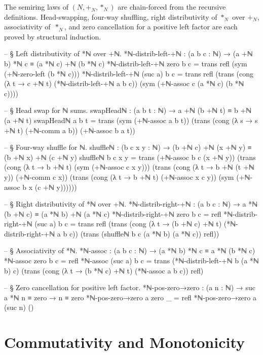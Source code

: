 \documentclass[11pt,a4paper]{book}
\def\mathbb#1{#1}%
\begin{document}
The semiring laws of $(\mathbb{N}, +_{\mathbb{N}}, *_{\mathbb{N}})$ are chain-forced from the recursive definitions.
Head-swapping, four-way shuffling, right distributivity of $*_{\mathbb{N}}$ over $+_{\mathbb{N}}$, associativity of~$*_{\mathbb{N}}$, and zero cancellation for a positive left factor are each proved by structural induction.

\begin{code}
-- § Left distributivity of *ℕ over +ℕ.
*ℕ-distrib-left-+ℕ : (a b c : ℕ) → (a +ℕ b) *ℕ c ≡ (a *ℕ c) +ℕ (b *ℕ c)
*ℕ-distrib-left-+ℕ zero b c =
  trans
    refl
    (sym (+ℕ-zero-left (b *ℕ c)))
*ℕ-distrib-left-+ℕ (suc a) b c =
  trans
    refl
    (trans
      (cong (λ t → c +ℕ t) (*ℕ-distrib-left-+ℕ a b c))
      (sym (+ℕ-assoc c (a *ℕ c) (b *ℕ c))))

-- § Head swap for ℕ sums.
swapHeadℕ : (a b t : ℕ) → a +ℕ (b +ℕ t) ≡ b +ℕ (a +ℕ t)
swapHeadℕ a b t =
  trans
    (sym (+ℕ-assoc a b t))
    (trans
      (cong (λ s → s +ℕ t) (+ℕ-comm a b))
      (+ℕ-assoc b a t))

-- § Four-way shuffle for ℕ.
shuffleℕ : (b c x y : ℕ) → (b +ℕ c) +ℕ (x +ℕ y) ≡ (b +ℕ x) +ℕ (c +ℕ y)
shuffleℕ b c x y =
  trans
    (+ℕ-assoc b c (x +ℕ y))
    (trans
      (cong (λ t → b +ℕ t) (sym (+ℕ-assoc c x y)))
      (trans
        (cong (λ t → b +ℕ (t +ℕ y)) (+ℕ-comm c x))
        (trans
          (cong (λ t → b +ℕ t) (+ℕ-assoc x c y))
          (sym (+ℕ-assoc b x (c +ℕ y))))))

-- § Right distributivity of *ℕ over +ℕ.
*ℕ-distrib-right-+ℕ : (a b c : ℕ) → a *ℕ (b +ℕ c) ≡ (a *ℕ b) +ℕ (a *ℕ c)
*ℕ-distrib-right-+ℕ zero b c = refl
*ℕ-distrib-right-+ℕ (suc a) b c =
  trans
    refl
    (trans
      (cong (λ t → (b +ℕ c) +ℕ t) (*ℕ-distrib-right-+ℕ a b c))
      (trans
        (shuffleℕ b c (a *ℕ b) (a *ℕ c))
        refl))

-- § Associativity of *ℕ.
*ℕ-assoc : (a b c : ℕ) → (a *ℕ b) *ℕ c ≡ a *ℕ (b *ℕ c)
*ℕ-assoc zero b c = refl
*ℕ-assoc (suc a) b c =
  trans
    (*ℕ-distrib-left-+ℕ b (a *ℕ b) c)
    (trans
      (cong (λ t → (b *ℕ c) +ℕ t) (*ℕ-assoc a b c))
      refl)

-- § Zero cancellation for positive left factor.
*ℕ-pos-zero→zero : (a n : ℕ) → suc a *ℕ n ≡ zero → n ≡ zero
*ℕ-pos-zero→zero a zero _ = refl
*ℕ-pos-zero→zero a (suc n) ()
\end{code}

\section{Commutativity and Monotonicity}
\end{document}
